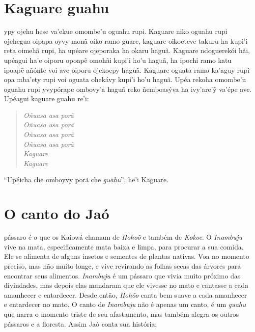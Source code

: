 \chapter{Kaguare guahu}

 ypy ojehu hese va'ekue omombe'u
oguahu rupi. Kaguare niko oguahu rupi ojehegua oipapa oyvy monã oiko ramo guare, kaguare oikoeteve takuru ha kupi'i reta oimehã rupi, ha
upéare ojeporaka ha okaru haguã. Kaguare ndoguerekói hãi, upéagui ha'e
oiporu opoapẽ omohãi kupi'i ho'u haguã, ha ipochi ramo katu ipoapẽ
añónte voi ave oiporu ojekoepy haguã. Kaguare oguata ramo ka'aguy rupi
opa mba'ety rupi voi oguata ohekávy kupi'i ho'u haguã. Upéa rekoha
omombe'u oguahu rupi yvypórape ombovy'a haguã reko ñemboasýva ha
ivy'are'ỹ va'épe ave. Upéagui kaguare guahu re'i:

\begin{verse}
\itshape
Oñuasa asa porã\\
Oñuasa asa porã\\
Oñuasa asa porã\\
Oñuasa asa porã\\
Kaguare\\
Kaguare
\end{verse}

``Upéicha che omboyvy porã che \emph{guahu}'', he'i Kaguare.

\chapter{O canto do Jaó}

 pássaro é o que os Kaiowá chamam de \emph{Hohoõ} e também de
\emph{Kokoe}. O \emph{Inambuju} vive na mata, especificamente mata baixa e
limpa, para procurar a sua comida. Ele se alimenta de alguns insetos e
sementes de plantas nativas. Voa no momento preciso, mas não muito
longe, e vive revirando as folhas secas das árvores para encontrar seus
alimentos. \emph{Inambuju} é um pássaro que vivia muito próximo das
divindades, mas depois elas mandaram que ele vivesse no mato e cantasse
a cada amanhecer e entardecer. Desde então, \emph{Hohõo} canta bem suave
a cada amanhecer e entardecer no mato. O canto de \emph{Inambuju} não é apenas
um canto, é um \emph{guahu} que narra o momento triste de seu
afastamento, mas também alegra os outros pássaros e a floresta. Assim
Jaó conta sua história:

